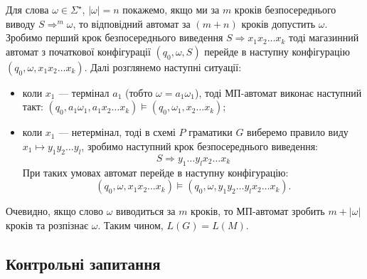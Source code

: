 Для слова $\omega \in \Sigma^\star$, $|\omega| = n$ покажемо, якщо ми за $m$ кроків 
безпосереднього виводу $S \Rightarrow^m \omega$, то відповідний автомат за $(m + n)$ кроків допустить $\omega$. Зробимо перший крок безпосереднього виведення $S \Rightarrow x_1 x_2 \ldots x_k$ тоді магазинний автомат з початкової конфігурації $(q_0, \omega, S)$ перейде в наступну конфігурацію $(q_0, \omega, x_1 x_2 \ldots x_k)$. Далі розглянемо наступні ситуації:
\begin{itemize}
	\item коли $x_1$ --- термінал $a_1$ (тобто $\omega = a_1 \omega_1$), тоді МП-автомат виконає наступний такт: $(q_0, a_1 \omega_1, a_1 x_2 \ldots x_k) \models (q_0, \omega_1, x_2 \ldots x_k)$;
	\item коли $x_1$ --- нетермінал, тоді в схемі $P$ граматики $G$ виберемо правило виду $x_1 \mapsto y_1 y_2 \ldots y_l$, зробимо наступний крок безпосереднього виведення:
    \begin{equation}
       S \Rightarrow y_1 \ldots y_l x_2 \ldots x_k
	\end{equation}
	При таких умовах автомат перейде в наступну конфігурацію:
	\begin{equation}
		(q_0, \omega, x_1 x_2 \ldots x_k) \models (q_0, \omega, y_1 y_2 \ldots y_l x_2 \ldots x_k).
	\end{equation}
\end{itemize}

Очевидно, якщо слово $\omega$ виводиться за $m$ кроків, то МП-автомат зробить $m + |\omega|$ кроків та розпізнає $\omega$. Таким чином, $L(G) = L(M)$.

\subsection{Контрольні запитання}

